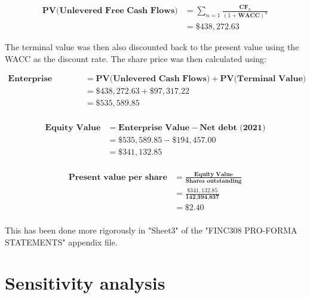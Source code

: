 \documentclass{article}
\begin{document}
\begin{equation}
\begin{split}
\textbf{PV(Unlevered Free Cash Flows)} &= \sum_{n=1}\frac{\textbf{CF}_n}{(1+\textbf{WACC})^n} \\
                                       &= \$438,272.63
\end{split}
\end{equation}

The terminal value was then also discounted back to the present value using the WACC as the discount rate. The share price was then calculated using:

\begin{equation*}
\begin{split}
\textbf{Enterprise Value} &= \textbf{PV(Unlevered Cash Flows)} + \textbf{PV(Terminal Value)} \\
                          &= \$438,272.63 + \$97,317.22 \\
                          &= \$535,589.85 \\
\end{split}
\end{equation*}

\begin{equation*}
\begin{split}
\textbf{Equity Value}     &= \textbf{Enterprise Value} - \textbf{Net debt (2021)} \\
                          &= \$535,589.85 - \$194,457.00 \\
                          &= \$341,132.85 \\
\end{split}
\end{equation*}

\begin{equation*}
\begin{split}
\textbf{Present value per share} &= \frac{\textbf{Equity Value}}{\textbf{Shares outstanding}} \\
                                 &= \frac{\$341,132.85}{\textbf{142,394,837}} \\
                                 &= \$2.40 \\
\end{split}
\end{equation*}

This has been done more rigorously in "Sheet3" of the "FINC308 PRO-FORMA STATEMENTS" appendix file.


\newpage
\section{Sensitivity analysis}
\end{document}
